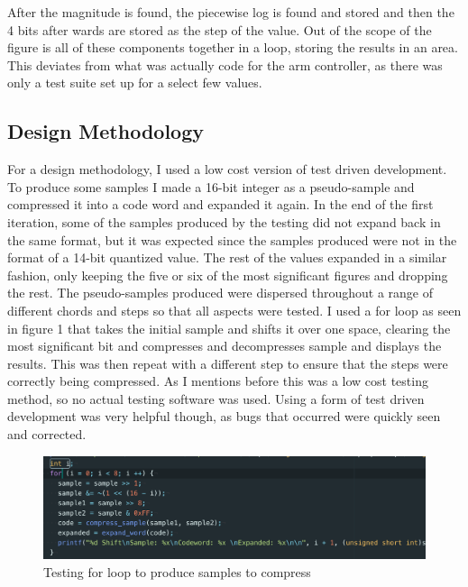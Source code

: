 \documentclass[12pt]{article}
\begin{document}
After the magnitude is found, the piecewise log is found and stored and then the 4 bits after wards are stored as the step of the value. Out of the scope of the figure is all of these components together in a loop, storing the results in an area. This deviates from what was actually code for the arm controller, as there was only a test suite set up for a select few values.

\subsection{Design Methodology}

For a design methodology, I used a low cost version of test driven development. To produce some samples I made a 16-bit integer as a pseudo-sample and compressed it into a code word and expanded it again. In the end of the first iteration, some of the samples produced by the testing did not expand back in the same format, but it was expected since the samples produced were not in the format of a 14-bit quantized value. The rest of the values expanded in a similar fashion, only keeping the five or six of the most significant figures and dropping the rest. The pseudo-samples produced were dispersed throughout a range of different chords and steps so that all aspects were tested. I used a for loop as seen in figure 1 that takes the initial sample and shifts it over one space, clearing the most significant bit and compresses and decompresses sample and displays the results. This was then repeat with a different step to ensure that the steps were correctly being compressed. As I mentions before this was a low cost testing method, so no actual testing software was used. Using a form of test driven development was very helpful though, as bugs that occurred were quickly seen and corrected.\\

\begin{figure}[!h]
        \includegraphics[width=\textwidth]
        {testingLoop.png}
        \caption{\label{fig:test_loop} Testing for loop to produce samples to compress}
\end{figure}
\end{document}
